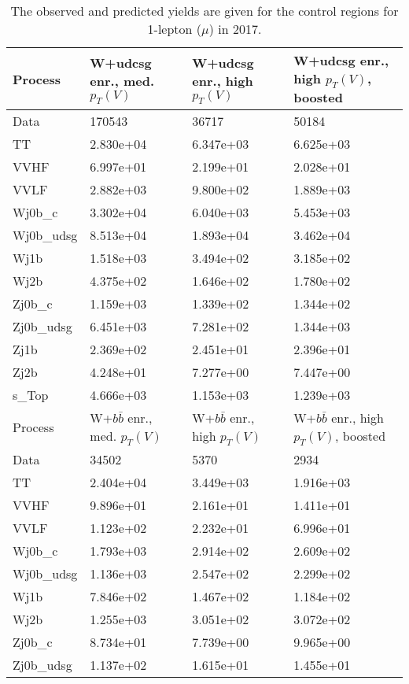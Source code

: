 \begin{table}
\centering
\caption[2017 1-lepton ($\mu$) control region yields]{
                  The observed and predicted yields are given for the
                  control regions for 1-lepton ($\mu$) in 2017.
                  }
{\footnotesize
\begin{tabularx}{0.8\textwidth}{|X|X|X|X|}
\hline
Process & W+udcsg enr., med. $p_{T}(V)$ & W+udcsg enr., high $p_{T}(V)$ & W+udcsg enr., high $p_{T}(V)$, boosted \\
\hline
Data & 170543 & 36717 & 50184 \\
\hline
TT & 2.830e+04 & 6.347e+03 & 6.625e+03 \\
VVHF & 6.997e+01 & 2.199e+01 & 2.028e+01 \\
VVLF & 2.882e+03 & 9.800e+02 & 1.889e+03 \\
Wj0b\_c & 3.302e+04 & 6.040e+03 & 5.453e+03 \\
Wj0b\_udsg & 8.513e+04 & 1.893e+04 & 3.462e+04 \\
Wj1b & 1.518e+03 & 3.494e+02 & 3.185e+02 \\
Wj2b & 4.375e+02 & 1.646e+02 & 1.780e+02 \\
Zj0b\_c & 1.159e+03 & 1.339e+02 & 1.344e+02 \\
Zj0b\_udsg & 6.451e+03 & 7.281e+02 & 1.344e+03 \\
Zj1b & 2.369e+02 & 2.451e+01 & 2.396e+01 \\
Zj2b & 4.248e+01 & 7.277e+00 & 7.447e+00 \\
s\_Top & 4.666e+03 & 1.153e+03 & 1.239e+03 \\
\hline
\hline
Process & W+$b\bar{b}$ enr., med. $p_{T}(V)$ & W+$b\bar{b}$ enr., high $p_{T}(V)$ & W+$b\bar{b}$ enr., high $p_{T}(V)$, boosted \\
\hline
Data & 34502 & 5370 & 2934 \\
\hline
TT & 2.404e+04 & 3.449e+03 & 1.916e+03 \\
VVHF & 9.896e+01 & 2.161e+01 & 1.411e+01 \\
VVLF & 1.123e+02 & 2.232e+01 & 6.996e+01 \\
Wj0b\_c & 1.793e+03 & 2.914e+02 & 2.609e+02 \\
Wj0b\_udsg & 1.136e+03 & 2.547e+02 & 2.299e+02 \\
Wj1b & 7.846e+02 & 1.467e+02 & 1.184e+02 \\
Wj2b & 1.255e+03 & 3.051e+02 & 3.072e+02 \\
Zj0b\_c & 8.734e+01 & 7.739e+00 & 9.965e+00 \\
Zj0b\_udsg & 1.137e+02 & 1.615e+01 & 1.455e+01 \\

\end{tabularx}}
\end{table}
